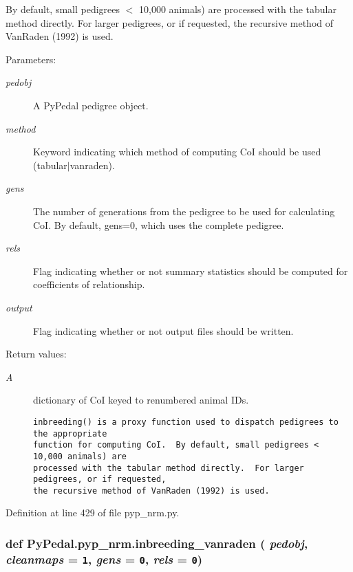By default, small pedigrees $<$ 10,000 animals) are processed with the tabular method directly. For larger pedigrees, or if requested, the recursive method of Van\-Raden (1992) is used. \begin{Desc}
\item[Parameters:]
\begin{description}
\item[{\em pedobj}]A Py\-Pedal pedigree object. \item[{\em method}]Keyword indicating which method of computing Co\-I should be used (tabular$|$vanraden). \item[{\em gens}]The number of generations from the pedigree to be used for calculating Co\-I. By default, gens=0, which uses the complete pedigree. \item[{\em rels}]Flag indicating whether or not summary statistics should be computed for coefficients of relationship. \item[{\em output}]Flag indicating whether or not output files should be written. \end{description}
\end{Desc}
\begin{Desc}
\item[Return values:]
\begin{description}
\item[{\em A}]dictionary of Co\-I keyed to renumbered animal IDs.

\footnotesize\begin{verbatim}inbreeding() is a proxy function used to dispatch pedigrees to the appropriate
function for computing CoI.  By default, small pedigrees < 10,000 animals) are
processed with the tabular method directly.  For larger pedigrees, or if requested,
the recursive method of VanRaden (1992) is used.
\end{verbatim}
\normalsize
 \end{description}
\end{Desc}


Definition at line 429 of file pyp\_\-nrm.py.\hypertarget{namespacePyPedal_1_1pyp__nrm_577fd15845cca08988029a7ccf7f68e4}{
\subsubsection[inbreeding\_\-vanraden]{\setlength{\rightskip}{0pt plus 5cm}def Py\-Pedal.pyp\_\-nrm.inbreeding\_\-vanraden ( {\em pedobj},  {\em cleanmaps} = {\tt 1},  {\em gens} = {\tt 0},  {\em rels} = {\tt 0})}}
\label{namespacePyPedal_1_1pyp__nrm_577fd15845cca08988029a7ccf7f68e4}


